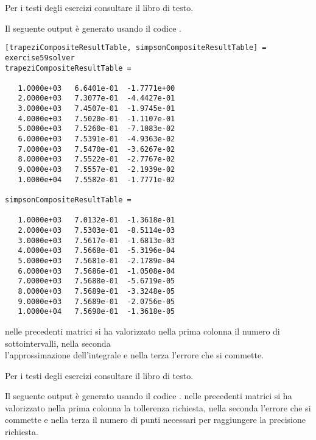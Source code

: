 \begin{exercise} 
Per i testi degli esercizi consultare il libro di testo.
\end{exercise}
Il seguente output \`e generato usando il codice
.
\begin{lstlisting}
[trapeziCompositeResultTable, simpsonCompositeResultTable] = exercise59solver
trapeziCompositeResultTable =

   1.0000e+03   6.6401e-01  -1.7771e+00
   2.0000e+03   7.3077e-01  -4.4427e-01
   3.0000e+03   7.4507e-01  -1.9745e-01
   4.0000e+03   7.5020e-01  -1.1107e-01
   5.0000e+03   7.5260e-01  -7.1083e-02
   6.0000e+03   7.5391e-01  -4.9363e-02
   7.0000e+03   7.5470e-01  -3.6267e-02
   8.0000e+03   7.5522e-01  -2.7767e-02
   9.0000e+03   7.5557e-01  -2.1939e-02
   1.0000e+04   7.5582e-01  -1.7771e-02

simpsonCompositeResultTable =

   1.0000e+03   7.0132e-01  -1.3618e-01
   2.0000e+03   7.5303e-01  -8.5114e-03
   3.0000e+03   7.5617e-01  -1.6813e-03
   4.0000e+03   7.5668e-01  -5.3196e-04
   5.0000e+03   7.5681e-01  -2.1789e-04
   6.0000e+03   7.5686e-01  -1.0508e-04
   7.0000e+03   7.5688e-01  -5.6719e-05
   8.0000e+03   7.5689e-01  -3.3248e-05
   9.0000e+03   7.5689e-01  -2.0756e-05
   1.0000e+04   7.5690e-01  -1.3618e-05
\end{lstlisting}
nelle precedenti matrici si ha valorizzato nella prima colonna il numero di
sottointervalli, nella seconda \\
l'approssimazione dell'integrale e nella terza l'errore che si commette.

\begin{exercise} 
Per i testi degli esercizi consultare il libro di testo.
\end{exercise}
Il seguente output \`e generato usando il codice
.
% 
% 
% 
nelle precedenti matrici si ha valorizzato nella prima colonna la tollerenza
richiesta, nella seconda l'errore che si commette e nella terza il numero di
punti necessari per raggiungere la precisione richiesta.
